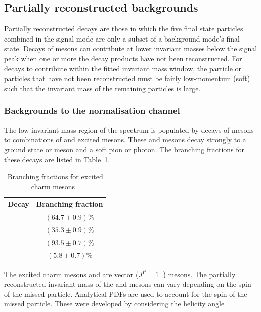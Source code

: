 \subsection{Partially reconstructed backgrounds}
\label{sec:B2DsKK_partrecocomps}

Partially reconstructed decays are those in which the five final state particles combined in the signal mode are only a subset of a background mode's final state.
Decays of \B mesons can contribute at lower invariant masses below the signal peak when one or more the decay products have not been reconstructed. 
For decays to contribute within the fitted \Bp invariant mass window, the particle or particles that have not been reconstructed must be fairly low-momentum (soft) such that the invariant mass of the remaining particles is large.

\subsubsection{Backgrounds to the normalisation channel}

The low invariant mass region of the \Dsp\Dzb spectrum is populated by decays of \Bp mesons to combinations of \D and excited \D mesons. These \Dstarzb and \Dss mesons decay strongly to a ground state \Dzb or \Dsp meson and a soft pion or photon. The branching fractions for these decays are listed in Table~\ref{tab:dstar_BFs}.


\begin{table}[h]
\centering
\begin{tabular}{ l c }

\hline
Decay                           & Branching fraction \\ 
\hline
\decay{\Dstarzb}{\Dzb\Pgamma}   &   $(64.7\pm0.9)\%$ \\
\decay{\Dstarzb}{\Dzb\piz}      &   $(35.3\pm0.9)\%$ \\
\decay{\Dssp}{\Dsp\Pgamma}        &   $(93.5\pm0.7)\%$ \\
\decay{\Dssp}{\Dsp\piz}           &   $(5.8\pm0.7)\%$ \\
\hline

\end{tabular}
\caption{Branching fractions for excited charm mesons \cite{PDG2016}. } 
\label{tab:dstar_BFs}  
\end{table}

The excited charm mesons \Dstarzb and  are vector ($J^{P} = 1^{-}$) mesons. The partially reconstructed invariant mass of the \Dsp and \Dzb mesons can vary depending on the spin of the missed particle.
Analytical PDFs are used to account for the spin of the missed particle. These were developed by considering the helicity angle 





